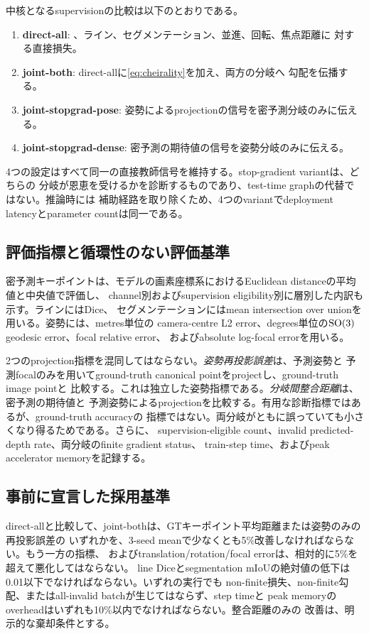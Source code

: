 

中核となるsupervisionの比較は以下のとおりである。
\begin{enumerate}
  \item \textbf{direct-all}: \KP{}、ライン、セグメンテーション、並進、回転、焦点距離に
    対する直接損失。
  \item \textbf{joint-both}: direct-allに\cref{eq:cheirality}を加え、両方の分岐へ
    勾配を伝播する。
  \item \textbf{joint-stopgrad-pose}: 姿勢によるprojectionの信号を密予測分岐のみに伝える。
  \item \textbf{joint-stopgrad-dense}: 密予測の期待値の信号を姿勢分岐のみに伝える。
\end{enumerate}
4つの設定はすべて同一の直接教師信号を維持する。stop-gradient variantは、どちらの
分岐が恩恵を受けるかを診断するものであり、test-time graphの代替ではない。推論時には
補助経路を取り除くため、4つのvariantでdeployment latencyとparameter countは同一である。

\subsection{評価指標と循環性のない評価基準}

密予測キーポイントは、モデルの画素座標系におけるEuclidean distanceの平均値と中央値で評価し、
channel別およびsupervision eligibility別に層別した内訳も示す。ラインにはDice、
セグメンテーションにはmean intersection over unionを用いる。姿勢には、metres単位の
camera-centre L2 error、degrees単位の\(\mathrm{SO}(3)\) geodesic error、focal relative error、
およびabsolute log-focal errorを用いる。

2つのprojection指標を混同してはならない。\emph{姿勢再投影誤差}は、予測姿勢と
予測focalのみを用いてground-truth canonical pointをprojectし、ground-truth image pointと
比較する。これは独立した姿勢指標である。\emph{分岐間整合距離}は、密予測の期待値と
予測姿勢によるprojectionを比較する。有用な診断指標ではあるが、ground-truth accuracyの
指標ではない。両分岐がともに誤っていても小さくなり得るためである。さらに、
supervision-eligible count、invalid predicted-depth rate、両分岐のfinite gradient status、
train-step time、およびpeak accelerator memoryを記録する。

\subsection{事前に宣言した採用基準}

direct-allと比較して、joint-bothは、GTキーポイント平均距離または姿勢のみの再投影誤差の
いずれかを、3-seed meanで少なくとも5\%改善しなければならない。もう一方の指標、
およびtranslation/rotation/focal errorは、相対的に5\%を超えて悪化してはならない。
line Diceとsegmentation mIoUの絶対値の低下は0.01以下でなければならない。いずれの実行でも
non-finite損失、non-finite勾配、またはall-invalid batchが生じてはならず、step timeと
peak memoryのoverheadはいずれも10\%以内でなければならない。整合距離のみの
改善は、明示的な棄却条件とする。

